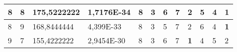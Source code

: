 \documentclass[conference]{IEEEtran}
\begin{document}
\begin{table*}[]
\begin{tabular}{|llll|llllllll|}
\multicolumn{1}{|l|}{8}                                                              & \multicolumn{1}{l|}{8}                                                                 & \multicolumn{1}{l|}{175,5222222}                                                           & 1,7176E-34                              & \multicolumn{1}{l|}{8}                                                           & \multicolumn{1}{l|}{3}                                                           & \multicolumn{1}{l|}{6}                                                           & \multicolumn{1}{l|}{7}                                                           & \multicolumn{1}{l|}{2}                                                           & \multicolumn{1}{l|}{5}                                                           & \multicolumn{1}{l|}{4}                                                           & \textbf{1}                          \\ \hline
\multicolumn{1}{|l|}{8}                                                              & \multicolumn{1}{l|}{9}                                                                 & \multicolumn{1}{l|}{168,8444444}                                                           & 4,399E-33                               & \multicolumn{1}{l|}{8}                                                           & \multicolumn{1}{l|}{3}                                                           & \multicolumn{1}{l|}{5}                                                           & \multicolumn{1}{l|}{7}                                                           & \multicolumn{1}{l|}{2}                                                           & \multicolumn{1}{l|}{6}                                                           & \multicolumn{1}{l|}{4}                                                           & \textbf{1}                          \\ \hline
\multicolumn{1}{|l|}{9}                                                              & \multicolumn{1}{l|}{7}                                                                 & \multicolumn{1}{l|}{155,4222222}                                                           & 2,9454E-30                              & \multicolumn{1}{l|}{8}                                                           & \multicolumn{1}{l|}{3}                                                           & \multicolumn{1}{l|}{6}                                                           & \multicolumn{1}{l|}{7}                                                           & \multicolumn{1}{l|}{\textbf{1}}                                                  & \multicolumn{1}{l|}{4}                                                           & \multicolumn{1}{l|}{5}                                                           & 2                                   \\ \hline

\end{tabular}
\end{table*}
\end{document}
